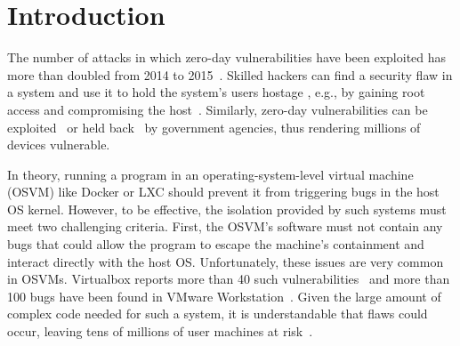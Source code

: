 \section{Introduction}
\label{sec.introduction}

%
The number of attacks in which zero-day vulnerabilities have been exploited has more than
doubled from 2014 to 2015~\cite{zero-day}. Skilled hackers can find a security
flaw in a system and use it to hold the system's users hostage , e.g., by
gaining root access and compromising the host~\cite{linux-0day}. Similarly, zero-day
vulnerabilities can be exploited~\cite{fbi-0day} or held back~\cite{nsa-0day} by government
agencies, thus rendering millions of devices vulnerable.
%

In theory, running a program in an operating-system-level virtual machine (OSVM) like Docker or LXC should
prevent it from triggering bugs in the host OS kernel.  However, to be
effective, the isolation provided by such systems must meet two challenging criteria. First, the OSVM's
software must not contain any bugs that could allow the program to escape the
machine's containment and interact directly with the host OS.
Unfortunately, these issues are very common in OSVMs. Virtualbox reports more than 40 such
vulnerabilities~\cite{Virtualbox-Vulnerabilities} and more than 100 bugs have
been found in VMware Workstation~\cite{VMWare-Vulnerabilities}.
Given the large amount of complex code needed for such a system, it is understandable that flaws could occur,
leaving tens of millions of user machines at risk~\cite{linux-0day}.

